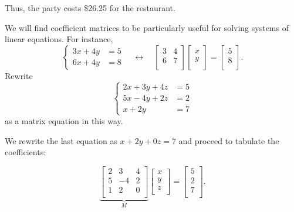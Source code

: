 \documentclass[../gatm_answers.tex]{subfiles}
\begin{document}
Thus, the party costs \$26.25 for the restaurant.

\begin{outer_problem}
\item We will find coefficient matrices to be particularly useful for solving systems of linear equations. For instance, $$\begin{cases}3x+4y&=5 \\ 6x+4y &= 8\end{cases}\quad\longleftrightarrow\quad\left[\begin{array}{cc} 3 & 4 \\ 6 & 7 \\ \end{array}\right]\left[\begin{array}{c} x \\ y \\ \end{array}\right]=\left[\begin{array}{c} 5 \\ 8 \\ \end{array}\right].$$ Rewrite $$\begin{cases}2x+3y+4z&=5 \\ 5x-4y+2z &= 2 \\ x+2y &= 7\end{cases}$$ as a matrix equation in this way.
\end{outer_problem}

We rewrite the last equation as $x+2y+0z=7$ and proceed to tabulate the coefficients:

$$\underbrace{\begin{bmatrix}
2 & 3 & 4 \\
5 & -4 & 2 \\
1 & 2 & 0 \\
\end{bmatrix}}_{M} \begin{bmatrix}
x \\
y \\
z \\
\end{bmatrix} = \begin{bmatrix}
5 \\
2 \\
7 \\
\end{bmatrix}.$$

\begin{outer_problem}
\item
\end{outer_problem}
\end{document}
